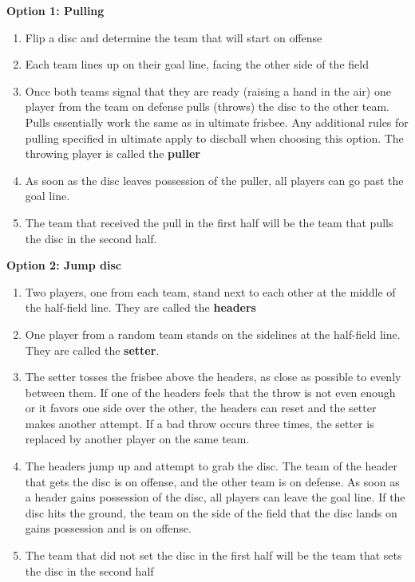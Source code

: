 \documentclass[10pt]{article}
\begin{document}
\textbf{Option 1: Pulling}
\begin{enumerate}
    \item Flip a disc and determine the team that will start on offense
    \item Each team lines up on their goal line, facing the other side of the field
    \item Once both teams signal that they are ready (raising a hand in the air) one player from the team on defense pulls (throws) the disc to the other team. Pulls essentially work the same as in ultimate frisbee. Any additional rules for pulling specified in ultimate apply to discball when choosing this option. The throwing player is called the \textbf{puller}
    \item As soon as the disc leaves possession of the puller, all players can go past the goal line.
    \item The team that received the pull in the first half will be the team that pulls the disc in the second half.
\end{enumerate}

\textbf{Option 2: Jump disc}
\begin{enumerate}
    \item Two players, one from each team, stand next to each other at the middle of the half-field line. They are called the \textbf{headers}
    \item One player from a random team stands on the sidelines at the half-field line. They are called the \textbf{setter}.
    \item The setter tosses the frisbee above the headers, as close as possible to evenly between them. If one of the headers feels that the throw is not even enough or it favors one side over the other, the headers can reset and the setter makes another attempt. If a bad throw occurs three times, the setter is replaced by another player on the same team.
    \item The headers jump up and attempt to grab the disc. The team of the header that gets the disc is on offense, and the other team is on defense. As soon as a header gains possession of the disc, all players can leave the goal line. If the disc hits the ground, the team on the side of the field that the disc lands on gains possession and is on offense.
    \item The team that did not set the disc in the first half will be the team that sets the disc in the second half
\end{enumerate}
\end{document}
